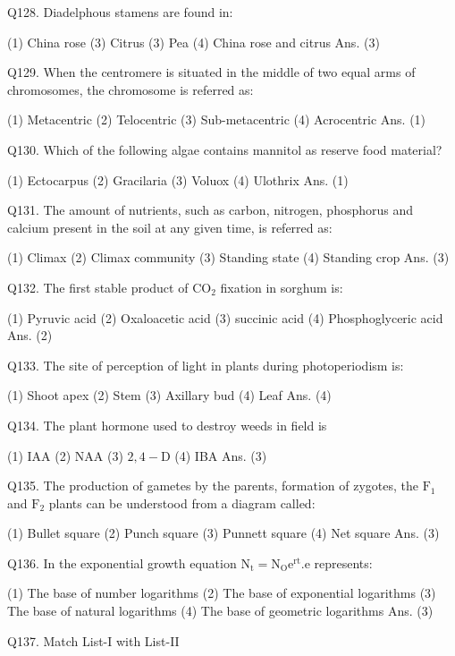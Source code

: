 \begin{enumerate}
Q128. Diadelphous stamens are found in:

(1) China rose
(3) Citrus
(3) Pea
(4) China rose and citrus
Ans. (3)

Q129. When the centromere is situated in the middle of two equal arms of chromosomes, the chromosome is referred as:

(1) Metacentric
(2) Telocentric
(3) Sub-metacentric
(4) Acrocentric
Ans. (1)

Q130. Which of the following algae contains mannitol as reserve food material?

(1) Ectocarpus
(2) Gracilaria
(3) Voluox
(4) Ulothrix
Ans. (1)

Q131. The amount of nutrients, such as carbon, nitrogen, phosphorus and calcium present in the soil at any given time, is referred as:

(1) Climax
(2) Climax community
(3) Standing state
(4) Standing crop
Ans. (3)

Q132. The first stable product of $\mathrm{CO}_{2}$ fixation in sorghum is:

(1) Pyruvic acid
(2) Oxaloacetic acid
(3) succinic acid
(4) Phosphoglyceric acid
Ans. (2)

Q133. The site of perception of light in plants during photoperiodism is:

(1) Shoot apex
(2) Stem
(3) Axillary bud
(4) Leaf
Ans. (4)

Q134. The plant hormone used to destroy weeds in field is

(1) IAA
(2) NAA
(3) $2,4-\mathrm{D}$
(4) IBA
Ans. (3)

Q135. The production of gametes by the parents, formation of zygotes, the $\mathrm{F}_{1}$ and $\mathrm{F}_{2}$ plants can be understood from a diagram called:

(1) Bullet square
(2) Punch square
(3) Punnett square
(4) Net square
Ans. (3)


Q136. In the exponential growth equation $\mathrm{N}_{\mathrm{t}}=\mathrm{N}_{\mathrm{O}} \mathrm{e}^{\mathrm{rt}} . \mathrm{e}$ represents:

(1) The base of number logarithms
(2) The base of exponential logarithms
(3) The base of natural logarithms
(4) The base of geometric logarithms
Ans. (3)

Q137. Match List-I with List-II


\end{enumerate}
